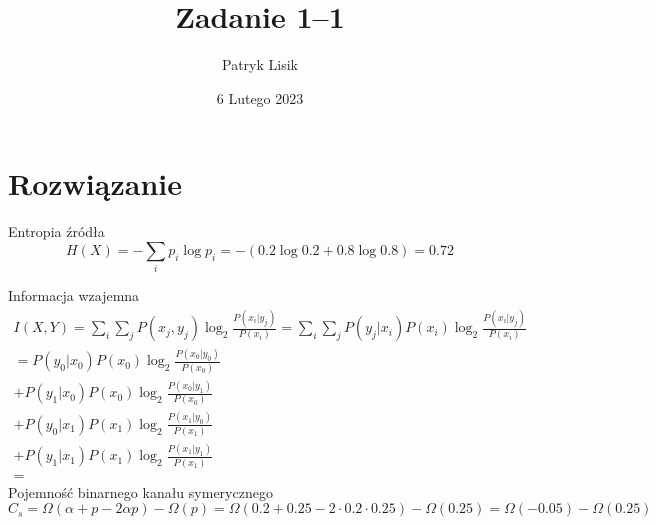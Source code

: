 \documentclass[12pt]{article}
\title{Zadanie 1--1}
\author{Patryk Lisik}
\date{\(6\) Lutego  2023}
\begin{document}
    \maketitle
    \renewcommand{\abstractname}{Treść}

    \begin{abstract}
    \end{abstract}


    \section*{Rozwiązanie}

    Entropia źródła
    \begin{equation*}
        H(X) = -\sum_i p_i \log p_i = -(0.2 \log 0.2 + 0.8 \log 0.8) = 0.72
    \end{equation*}

    Informacja wzajemna
    \begin{multline*}
        I(X,Y)  = \sum_{i}\sum_j P(x_j,y_j)\log_2 \frac{P(x_i|y_j)}{P(x_i)}
        = \sum_{i}\sum_j P(y_j|x_i)P(x_i)\log_2 \frac{P(x_i|y_j)}{P(x_i)} \\
        = P(y_0|x_0)P(x_0)\log_2 \frac{P(x_0|y_0)}{P(x_0)} \\
        + P(y_1|x_0)P(x_0)\log_2 \frac{P(x_0|y_1)}{P(x_0)} \\
        + P(y_0|x_1)P(x_1)\log_2 \frac{P(x_1|y_0)}{P(x_1)} \\
        + P(y_1|x_1)P(x_1)\log_2 \frac{P(x_1|y_1)}{P(x_1)} \\
        = 
    \end{multline*}
Pojemność binarnego kanału symerycznego
\begin{equation*}
    C_s = \Omega(\alpha + p - 2\alpha p) - \Omega (p) = \Omega(0.2+0.25 - 2 \cdot 0.2\cdot 0.25)-\Omega(0.25) = \Omega(-0.05)-\Omega(0.25)
\end{equation*}
    
\end{document}
